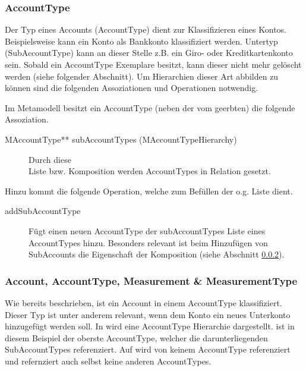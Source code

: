 \subsubsection{AccountType}
Der Typ eines Accounts (AccountType) dient zur Klassifizieren eines Kontos. Beispielsweise kann ein Konto als Bankkonto klassifiziert werden. Untertyp (SubAccountType) kann an dieser Stelle z.B. ein Giro- oder Kreditkartenkonto sein.
Sobald ein AccountType Exemplare besitzt, kann dieser nicht mehr gelöscht werden (siehe folgender Abschnitt). Um Hierarchien dieser Art abbilden zu können sind die folgenden Assoziationen und Operationen notwendig. 

Im Metamodell besitzt ein AccountType (neben der vom  geerbten) die folgende Assoziation.
\begin{description}
	\item[MAccountType** subAccountTypes (MAccountTypeHierarchy)] Durch diese \\Liste bzw. Komposition werden AccountTypes in Relation gesetzt.
\end{description}

Hinzu kommt die folgende Operation, welche zum Befüllen der o.g. Liste dient.
\begin{description}
	\item[addSubAccountType] Fügt einen neuen AccountType der subAccountTypes Liste eines AccountTypes hinzu. Besonders relevant ist beim Hinzufügen 
	von SubAccounts die Eigenschaft der Komposition (siehe Abschnitt \ref{Measurement:accUndAccType}).
\end{description}


\subsubsection{Account, AccountType, Measurement \& MeasurementType}\label{Measurement:accUndAccType}
Wie bereits beschrieben, ist ein Account in einem AccountType klassifiziert. Dieser Typ ist unter anderem relevant, wenn dem Konto ein neues Unterkonto hinzugefügt werden soll.  
In  wird eine AccountType Hierarchie dargestellt.  ist in diesem Beispiel der oberste AccountType, welcher die darunterliegenden SubAccountTypes referenziert. 
Auf  wird von keinem AccountType referenziert und refernziert auch selbst keine anderen AccountTypes.  


